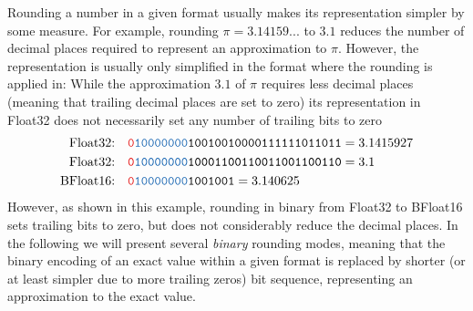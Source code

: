 Rounding a number in a given format usually makes its representation simpler by some measure. For example, rounding $\pi = 3.14159...$
to $3.1$ reduces the number of decimal places required to represent an approximation to $\pi$. However, the representation is usually
only simplified in the format where the rounding is applied in: While the approximation $3.1$ of $\pi$ requires less decimal places (meaning
that trailing decimal places are set to zero) its representation in Float32 does not necessarily set any number of trailing bits to zero
\begin{align}
\text{Float32:}& \quad \mathtt{{\color{psign}0}{\color{pexpo}10000000}10010010000111111011011} = 3.1415927 \nonumber \\
\text{Float32:}& \quad \mathtt{{\color{psign}0}{\color{pexpo}10000000}10001100110011001100110} = 3.1 \nonumber \\
\text{BFloat16:}& \quad \mathtt{{\color{psign}0}{\color{pexpo}10000000}1001001} = 3.140625
\end{align}
However, as shown in this example, rounding in binary from Float32 to BFloat16 sets trailing bits to zero, but does not considerably
reduce the decimal places. In the following we will present several \emph{binary} rounding modes, meaning that the binary encoding
of an exact value within a given format is replaced by shorter (or at least simpler due to more trailing zeros) bit sequence, representing
an approximation to the exact value.

